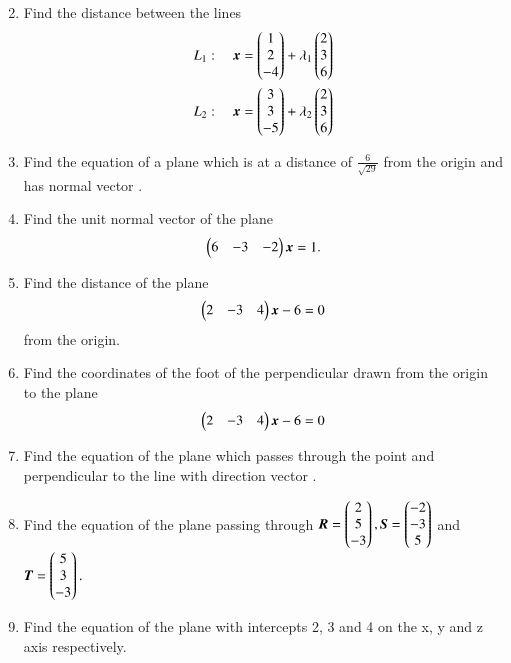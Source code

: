 \begin{enumerate}[label=\arabic*.,ref=\thesubsection.\theenumi]
\begin{align}
\end{align}
\item Find the 
distance between the lines 
\begin{align}
L_1: \quad \bm{x} &= \begin{pmatrix}1\\2\\-4\end{pmatrix} + \lambda_1\begin{pmatrix}2 \\ 3 \\6\end{pmatrix}
\\
L_2: \quad \bm{x} &= \begin{pmatrix}3\\3\\-5\end{pmatrix} + \lambda_2\begin{pmatrix}2 \\ 3 \\6\end{pmatrix}
\end{align}
%
\item Find the equation of a plane which is at a distance of $\frac{6}{\sqrt{29}}$ from the origin and has  normal vector .
\item Find the unit normal vector of the plane 
\begin{align}
\begin{pmatrix}6 & -3 & -2\end{pmatrix}\bm{x}  = 1.
\end{align}
\item Find the distance of the plane 
\begin{align}
\begin{pmatrix}2 & -3 & 4\end{pmatrix}\bm{x}-6  = 0
\end{align}
%
from the origin.
\item Find the coordinates of the foot of the perpendicular drawn from the origin to the plane 
\begin{align}
\begin{pmatrix}2 & -3 & 4\end{pmatrix}\bm{x}-6  = 0
\end{align}
%
\item Find the equation of the plane which passes through the point  and perpendicular to the line with direction vector .
\item Find the equation of the plane passing through 
$
\bm{R} = \begin{pmatrix}2\\5\\-3\end{pmatrix},
\bm{S}= \begin{pmatrix}-2\\-3\\5\end{pmatrix}
$ 
and 
$
\bm{T}= \begin{pmatrix}5\\3\\-3\end{pmatrix}.
$
\item Find the equation of the plane with intercepts 2, 3 and 4 on the x, y and z axis respectively.

\end{enumerate}
